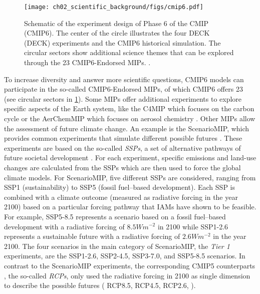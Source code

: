 \begin{figure}[t]
  \centering
  \texttt{[image: 
    ch02\_scientific\_background/figs/cmip6.pdf]}
  \caption[
    Schematic of the experiment design of Phase 6 of the \acl{CMIP}
    (\acs{CMIP}6).
  ]{
    Schematic of the experiment design of Phase 6 of the \acl{CMIP}
    (\acs{CMIP}6). The center of the circle illustrates the four \acs{DECK}
    (\acl{DECK}) experiments and the \acs{CMIP}6 historical simulation. The
    circular sectors show additional science themes that can be explored
    through the 23 \acs{CMIP}6-Endorsed \acfp{MIP}.
    .
  }
  \label{fig:02:cmip6}
\end{figure}

To increase diversity and answer more scientific questions, \acs{CMIP}6 models
can participate in the so-called \acs{CMIP}6-Endorsed \acp{MIP}, of which
\acs{CMIP}6 offers 23 (see circular sectors in \cref{fig:02:cmip6}). Some
\acp{MIP} offer additional experiments to explore specific aspects of the Earth
system, like the \ac{C4MIP} which focuses on the carbon cycle
\autocite{Jones2016} or the \ac{AerChemMIP} which focuses on aerosol chemistry
\autocite{Collins2017}. Other \acp{MIP} allow the assessment of future climate
change. An example is the \ac{ScenarioMIP}, which provides common experiments
that simulate different possible futures \autocite{ONeill2016}. These
experiments are based on the so-called \emph{\acp{SSP}}, a set of alternative
pathways of future societal development \autocite{ONeill2013, ONeill2017}. For
each experiment, specific emissions and land-use changes are calculated from
the \acp{SSP} \autocite{Riahi2017} which are then used to force the global
climate models. For \ac{ScenarioMIP}, five different \acp{SSP} are considered,
ranging from \acs{SSP}1 (sustainability) to \acs{SSP}5 (fossil fuel--based
development). Each \ac{SSP} is combined with a climate outcome (measured as
radiative forcing in the year 2100) based on a particular forcing pathway that
\acp{IAM} have shown to be feasible. For example, \acs{SSP}5-8.5 represents a
scenario based on a fossil fuel--based development with a radiative forcing of
$8.5 \unit{W m^{-2}}$ in 2100 while \acs{SSP}1-2.6 represents a sustainable
future with a radiative forcing of $2.6 \unit{W m^{-2}}$ in the year 2100. The
four scenarios in the main category of \ac{ScenarioMIP}, the \emph{Tier 1}
experiments, are the \acs{SSP}1-2.6, \acs{SSP}2-4.5, \acs{SSP}3-7.0, and
\acs{SSP}5-8.5 scenarios. In contrast to the \ac{ScenarioMIP} experiments, the
corresponding \acs{CMIP}5 counterparts \autocite{Taylor2012}, the so-called
\emph{\acp{RCP}}, only used the radiative forcing in 2100 as single dimension
to describe the possible futures (\eg{} \acs{RCP}8.5, \acs{RCP}4.5,
\acs{RCP}2.6, \etc{}).

